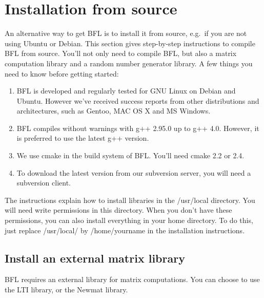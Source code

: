 \documentclass[a4paper,10pt]{article}
\begin{document}
\section{Installation from source}
An alternative way to get BFL is to install it from source, e.g.~if
you are not using Ubuntu or Debian. This section gives step-by-step
instructions to compile BFL from source. You'll not only need to
compile BFL, but also a matrix computation library and a random number
generator library. A few things you need to know before getting
started:
\begin{enumerate}
\item BFL is developed and regularly tested for GNU Linux on
  Debian and Ubuntu. However we've received success reports from other
  distributions and architectures, such as Gentoo, MAC OS X and MS
  Windows.
\item BFL compiles without warnings with g++ 2.95.0 up to g++ 4.0.
  However, it is preferred to use the latest g++ version.
\item We use cmake in the build system of BFL. You'll need cmake 2.2
  or 2.4.
\item To download the latest version from our subversion server, you
  will need a subversion client.
\end{enumerate}
The instructions explain how to install libraries in the /usr/local
directory. You will need write permissions in this directory. When you
don't have these permissions, you can also install everything in your
home directory. To do this, just replace /usr/local/ by
/home/yourname in the installation instructions.



\subsection{Install an external matrix library}
BFL requires an external library for matrix computations. You can
choose to use the LTI library, or the Newmat library.
\end{document}
